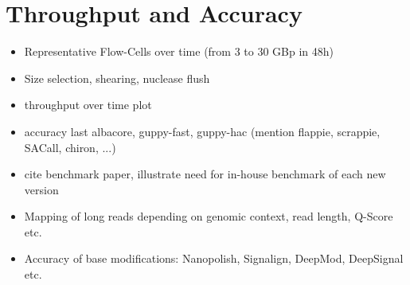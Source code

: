 \section{Throughput and Accuracy}

\begin{itemize}
    \item Representative Flow-Cells over time (from 3 to 30 GBp in 48h)
    \item Size selection, shearing, nuclease flush
    \item throughput over time plot
    \item accuracy last albacore, guppy-fast, guppy-hac (mention flappie, scrappie, SACall, chiron, ...)
    \item cite benchmark paper, illustrate need for in-house benchmark of each new version
    \item Mapping of long reads depending on genomic context, read length, Q-Score etc.
    \item Accuracy of base modifications: Nanopolish, Signalign, DeepMod, DeepSignal etc.
\end{itemize}